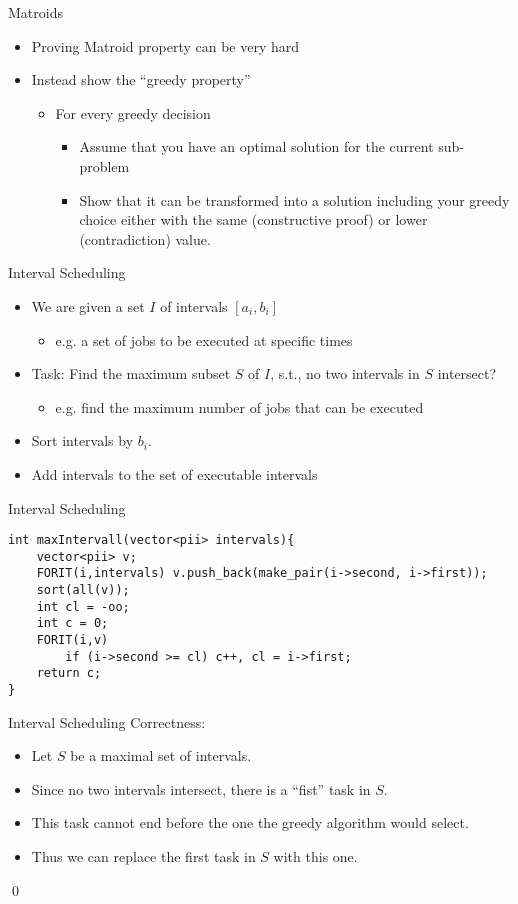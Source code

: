 \documentclass[12pt,t]{beamer}
\newcommand{\bi}{\begin{itemize}}
\newcommand{\ei}{\end{itemize}}
\begin{document}
\begin{frame}[fragile]{Matroids}
	\vspace{30pt}
	\bi
		\item Proving Matroid property can be very hard
		\item<2-> Instead show the ``greedy property''
		\bi
			\item<2-> For every greedy decision
			\bi
				\item<3-> Assume that you have an optimal solution for the current sub-problem
				\item<4-> Show that it can be transformed into a solution including your greedy choice either with the same (constructive proof) or lower (contradiction) value.
			\ei
		\ei
	\ei
\end{frame}


\begin{frame}[fragile]{Interval Scheduling}
    \vspace{30pt}
    \bi
        \item We are given a set $I$ of intervals $[a_i,b_i]$ 
        \bi \item e.g. a set of jobs to be executed at specific times \ei
        \item<2-> Task: Find the maximum subset $S$ of $I$, s.t., no two intervals in $S$ intersect?
        \bi \item<2-> e.g. find the maximum number of jobs that can be executed \ei
	    \vspace{30pt}
	    \item<3-> Sort intervals by $b_i$.
	    \item<4-> Add intervals to the set of executable intervals
    \ei
\end{frame}

\begin{frame}[fragile]{Interval Scheduling}
    \vspace{30pt}
    \begin{verbatim}
int maxIntervall(vector<pii> intervals){
    vector<pii> v;
    FORIT(i,intervals) v.push_back(make_pair(i->second, i->first));
    sort(all(v));
    int cl = -oo;
    int c = 0;
    FORIT(i,v)
        if (i->second >= cl) c++, cl = i->first;
    return c;
}
    \end{verbatim}
\end{frame}

\begin{frame}[fragile]{Interval Scheduling}
    \vspace{30pt}
    {\color{hilight}Correctness:}
    \bi
        \item Let $S$ be a maximal set of intervals.
        \item Since no two intervals intersect, there is a ``fist'' task in $S$.
        \item This task cannot end before the one the greedy algorithm would select.
        \item Thus we can replace the first task in $S$ with this one.
    \ei
    \flushleft\qed
\end{frame}
\end{document}
